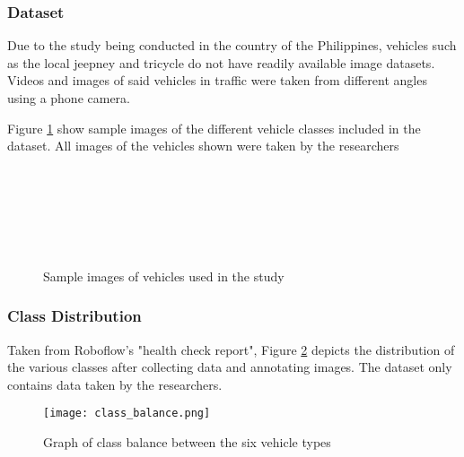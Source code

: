 \subsubsection{Dataset}

Due to the study being conducted in the country of the Philippines, vehicles such as the local jeepney and tricycle do not have readily available image datasets. Videos and images of said vehicles in traffic were taken from different angles using a phone camera. 

Figure \ref{fig:vehicle_samples} show sample images of the different vehicle classes included in the dataset. All images of the vehicles shown were taken by the researchers

\begin{figure}[!htbp]
	\begin{minipage}{1\textwidth}
		\centering
		
		\\
		
		\\
		
		\\
		
		\\
		
		\\
		
	\end{minipage}
	\caption{Sample images of vehicles used in the study}
	\label{fig:vehicle_samples}
\end{figure}
\FloatBarrier

\subsubsection{Class Distribution}
Taken from Roboflow's "health check report", Figure \ref{fig:class_bal} depicts the distribution of the various classes after collecting data and annotating images. The dataset only contains data taken by the researchers.

\begin{figure}[!htbp]
	\texttt{[image: class\_balance.png]}
	\caption{Graph of class balance between the six vehicle types}
	\label{fig:class_bal}
\end{figure}
\FloatBarrier

